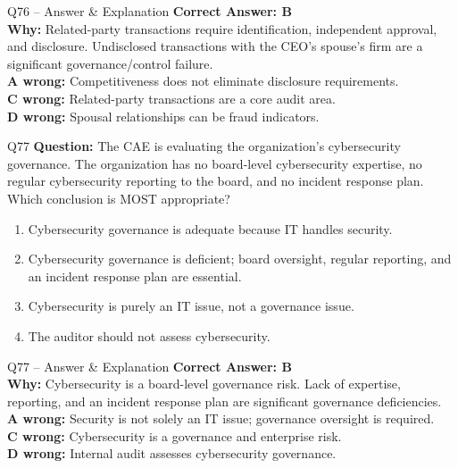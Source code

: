\documentclass[aspectratio=169,10pt]{beamer}
\begin{document}
	\begin{frame}[t]{Q76 -- Answer \& Explanation}
		\small
		\textbf{Correct Answer: B} \\[4pt]
		\textbf{Why:} Related-party transactions require identification, independent approval, and disclosure. Undisclosed transactions with the CEO's spouse's firm are a significant governance/control failure. \\[4pt]
		\textbf{A wrong:} Competitiveness does not eliminate disclosure requirements. \\[2pt]
		\textbf{C wrong:} Related-party transactions are a core audit area. \\[2pt]
		\textbf{D wrong:} Spousal relationships can be fraud indicators.
	\end{frame}
	
	\begin{frame}[t]{Q77}
		\small
		\textbf{Question:} The CAE is evaluating the organization's cybersecurity governance. The organization has no board-level cybersecurity expertise, no regular cybersecurity reporting to the board, and no incident response plan. Which conclusion is MOST appropriate?
		\begin{enumerate}[label=\Alph*.,itemsep=1pt,topsep=2pt]
			\item Cybersecurity governance is adequate because IT handles security.
			\item Cybersecurity governance is deficient; board oversight, regular reporting, and an incident response plan are essential.
			\item Cybersecurity is purely an IT issue, not a governance issue.
			\item The auditor should not assess cybersecurity.
		\end{enumerate}
	\end{frame}
	
	\begin{frame}[t]{Q77 -- Answer \& Explanation}
		\small
		\textbf{Correct Answer: B} \\[4pt]
		\textbf{Why:} Cybersecurity is a board-level governance risk. Lack of expertise, reporting, and an incident response plan are significant governance deficiencies. \\[4pt]
		\textbf{A wrong:} Security is not solely an IT issue; governance oversight is required. \\[2pt]
		\textbf{C wrong:} Cybersecurity is a governance and enterprise risk. \\[2pt]
		\textbf{D wrong:} Internal audit assesses cybersecurity governance.
	\end{frame}
	
\end{document}

